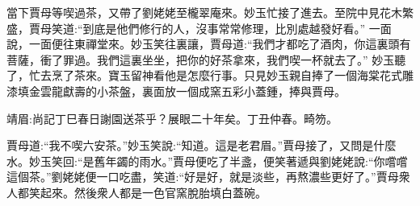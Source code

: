 \begin{parag}
    當下賈母等喫過茶，又帶了劉姥姥至櫳翠庵來。妙玉忙接了進去。至院中見花木繁盛，賈母笑道:“到底是他們修行的人，沒事常常修理，比別處越發好看。” 一面說，一面便往東禪堂來。妙玉笑往裏讓，賈母道:“我們才都吃了酒肉，你這裏頭有菩薩，衝了罪過。我們這裏坐坐，把你的好茶拿來，我們喫一杯就去了。” 妙玉聽了，忙去烹了茶來。寶玉留神看他是怎麼行事。只見妙玉親自捧了一個海棠花式雕漆填金雲龍獻壽的小茶盤，裏面放一個成窯五彩小蓋鍾，捧與賈母。\begin{note}靖眉:尚記丁巳春日謝園送茶乎？展眼二十年矣。丁丑仲春。畸笏。\end{note}賈母道:“我不喫六安茶。”妙玉笑說:“知道。這是老君眉。”賈母接了，又問是什麼水。妙玉笑回:“是舊年蠲的雨水。”賈母便吃了半盞，便笑著遞與劉姥姥說:“你嚐嚐這個茶。”劉姥姥便一口吃盡，笑道:“好是好，就是淡些，再熬濃些更好了。”賈母衆人都笑起來。然後衆人都是一色官窯脫胎填白蓋碗。
\end{parag}


